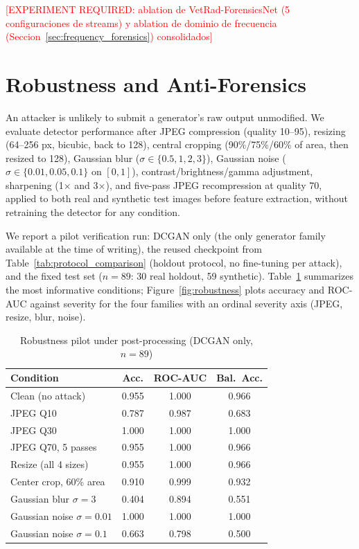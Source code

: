 \documentclass[journal]{IEEEtran}
\newcommand{\pending}[1]{\textcolor{red}{[EXPERIMENT REQUIRED: #1]}}
\begin{document}
\pending{ablation de VetRad-ForensicsNet (5 configuraciones de streams) y ablation de dominio de frecuencia (Seccion~\ref{sec:frequency_forensics}) consolidados}

\section{Robustness and Anti-Forensics}
\label{sec:robustness}

An attacker is unlikely to submit a generator's raw output unmodified. We evaluate detector performance after JPEG compression (quality 10--95), resizing (64--256 px, bicubic, back to 128), central cropping (90\%/75\%/60\% of area, then resized to 128), Gaussian blur ($\sigma \in \{0.5,1,2,3\}$), Gaussian noise ($\sigma \in \{0.01,0.05,0.1\}$ on $[0,1]$), contrast/brightness/gamma adjustment, sharpening (1$\times$ and 3$\times$), and five-pass JPEG recompression at quality 70, applied to both real and synthetic test images before feature extraction, without retraining the detector for any condition.

We report a pilot verification run: DCGAN only (the only generator family available at the time of writing), the reused checkpoint from Table~\ref{tab:protocol_comparison} (holdout protocol, no fine-tuning per attack), and the fixed test set ($n=89$: 30 real holdout, 59 synthetic). Table~\ref{tab:robustness_pilot} summarizes the most informative conditions; Figure~\ref{fig:robustness} plots accuracy and ROC-AUC against severity for the four families with an ordinal severity axis (JPEG, resize, blur, noise).

\begin{table}[t]
\centering
\caption{Robustness pilot under post-processing (DCGAN only, $n=89$)}
\label{tab:robustness_pilot}
\begin{tabular}{lccc}
\toprule
Condition & Acc. & ROC-AUC & Bal.\ Acc. \\
\midrule
Clean (no attack) & 0.955 & 1.000 & 0.966 \\
JPEG Q10 & 0.787 & 0.987 & 0.683 \\
JPEG Q30 & 1.000 & 1.000 & 1.000 \\
JPEG Q70, 5 passes & 0.955 & 1.000 & 0.966 \\
Resize (all 4 sizes) & 0.955 & 1.000 & 0.966 \\
Center crop, 60\% area & 0.910 & 0.999 & 0.932 \\
Gaussian blur $\sigma=3$ & 0.404 & 0.894 & 0.551 \\
Gaussian noise $\sigma=0.01$ & 1.000 & 1.000 & 1.000 \\
Gaussian noise $\sigma=0.1$ & 0.663 & 0.798 & 0.500 \\
\bottomrule
\end{tabular}
\end{table}
\end{document}
